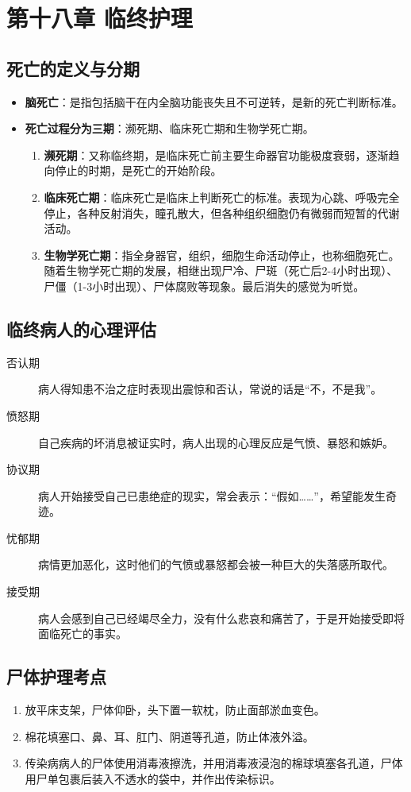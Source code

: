 \documentclass[11pt, a4paper]{ctexart}
\begin{document}
\section{第十八章 临终护理}
\subsection{死亡的定义与分期}
\begin{itemize}
    \item \textbf{脑死亡}：是指包括脑干在内全脑功能丧失且不可逆转，是新的死亡判断标准。
    \item \textbf{死亡过程分为三期}：濒死期、临床死亡期和生物学死亡期。
    \begin{enumerate}
        \item \textbf{濒死期}：又称临终期，是临床死亡前主要生命器官功能极度衰弱，逐渐趋向停止的时期，是死亡的开始阶段。
        \item \textbf{临床死亡期}：临床死亡是临床上判断死亡的标准。表现为心跳、呼吸完全停止，各种反射消失，瞳孔散大，但各种组织细胞仍有微弱而短暂的代谢活动。
        \item \textbf{生物学死亡期}：指全身器官，组织，细胞生命活动停止，也称细胞死亡。随着生物学死亡期的发展，相继出现尸冷、尸斑（死亡后2-4小时出现）、尸僵（1-3小时出现）、尸体腐败等现象。最后消失的感觉为听觉。
    \end{enumerate}
\end{itemize}

\subsection{临终病人的心理评估}
\begin{description}
    \item[否认期] 病人得知患不治之症时表现出震惊和否认，常说的话是“不，不是我”。
    \item[愤怒期] 自己疾病的坏消息被证实时，病人出现的心理反应是气愤、暴怒和嫉妒。
    \item[协议期] 病人开始接受自己已患绝症的现实，常会表示：“假如……”，希望能发生奇迹。
    \item[忧郁期] 病情更加恶化，这时他们的气愤或暴怒都会被一种巨大的失落感所取代。
    \item[接受期] 病人会感到自己已经竭尽全力，没有什么悲哀和痛苦了，于是开始接受即将面临死亡的事实。
\end{description}

\subsection{尸体护理考点}
\begin{enumerate}
    \item 放平床支架，尸体仰卧，头下置一软枕，防止面部淤血变色。
    \item 棉花填塞口、鼻、耳、肛门、阴道等孔道，防止体液外溢。
    \item 传染病病人的尸体使用消毒液擦洗，并用消毒液浸泡的棉球填塞各孔道，尸体用尸单包裹后装入不透水的袋中，并作出传染标识。
\end{enumerate}
\end{document}
